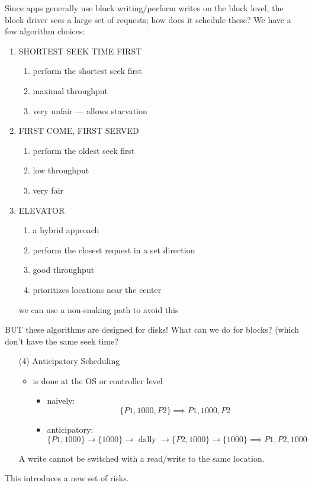 \documentclass[../../lecture_notes.tex]{subfiles}
\begin{document}
Since apps generally use block writing/perform writes on the block level, the block driver sees a large set of requests; how does it schedule these? We have a few algorithm choices:
\begin{enumerate}
\item SHORTEST SEEK TIME FIRST
	\begin{enumerate}
		\item perform the shortest seek first
		\item maximal throughput
		\item very unfair --- allows starvation
	\end{enumerate}
\item FIRST COME, FIRST SERVED
	\begin{enumerate}
		\item perform the oldest seek first
		\item low throughput
		\item very fair
	\end{enumerate}
\item ELEVATOR
	\begin{enumerate}
		\item a hybrid approach 
		\item perform the closest request in a set direction
		\item good throughput
		\item prioritizes locations near the center
	\end{enumerate}
	we can use a non-snaking path to avoid this
\end{enumerate}
BUT these algorithms are designed for disks! What can we do for blocks? (which don’t have the same seek time?
\begin{enumerate}
\item[(4)] Anticipatory Scheduling
	\begin{itemize}
		\item is done at the OS or controller level
		\begin{itemize}
		\item naively: $$\{P1, 1000, P2\} \implies P1, 1000, P2$$
		\item anticipatory: $$\{P1, 1000\} \rightarrow \{1000\} \rightarrow \text{ dally } \rightarrow \{P2, 1000\} \rightarrow \{1000\} \implies P1, P2, 1000$$
		\end{itemize}
	\end{itemize}
	A write cannot be switched with a read/write to the same location.
\end{enumerate}

This introduces a new set of risks.
\end{document}
